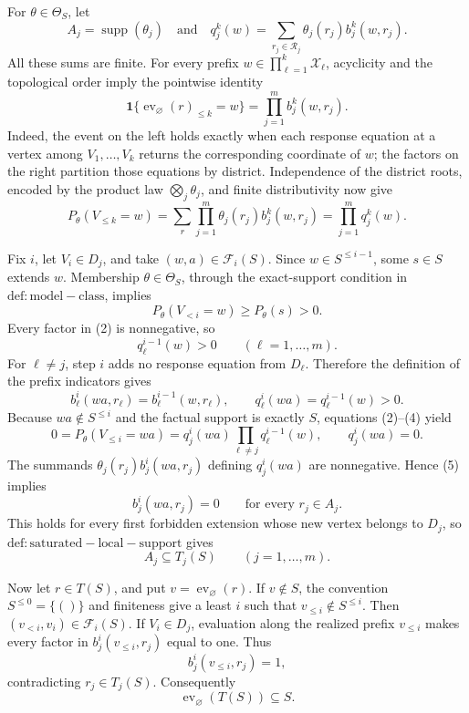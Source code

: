 For \(\theta\in\Theta_S\), let
\[
A_j=\operatorname{supp}(\theta_j)
\quad\text{and}\quad
q_j^k(w)=\sum_{r_j\in\mathcal R_j}\theta_j(r_j)b_j^k(w,r_j).
\]
All these sums are finite.  For every prefix \(w\in\prod_{\ell=1}^k\mathcal X_\ell\), acyclicity and the topological order imply the pointwise identity
\[
\mathbf 1\{\operatorname{ev}_{\varnothing}(r)_{\le k}=w\}
=\prod_{j=1}^m b_j^k(w,r_j).                                  \tag{1}
\]
Indeed, the event on the left holds exactly when each response equation at a vertex among \(V_1,\ldots,V_k\) returns the corresponding coordinate of \(w\); the factors on the right partition those equations by district.  Independence of the district roots, encoded by the product law \(\bigotimes_j\theta_j\), and finite distributivity now give
\[
P_\theta(V_{\le k}=w)
=\sum_r\prod_{j=1}^m\theta_j(r_j)b_j^k(w,r_j)
=\prod_{j=1}^m q_j^k(w).                                      \tag{2}
\]

Fix \(i\), let \(V_i\in D_j\), and take \((w,a)\in\mathcal F_i(S)\).  Since \(w\in S^{\le i-1}\), some \(s\in S\) extends \(w\).  Membership \(\theta\in\Theta_S\), through the exact-support condition in \(\mathrm{def:model-class}\), implies
\[
P_\theta(V_{<i}=w)\ge P_\theta(s)>0.
\]
Every factor in (2) is nonnegative, so
\[
q_\ell^{i-1}(w)>0\qquad(\ell=1,\ldots,m).                    \tag{3}
\]
For \(\ell\ne j\), step \(i\) adds no response equation from \(D_\ell\).  Therefore the definition of the prefix indicators gives
\[
b_\ell^i(wa,r_\ell)=b_\ell^{i-1}(w,r_\ell),
\qquad
q_\ell^i(wa)=q_\ell^{i-1}(w)>0.                              \tag{4}
\]
Because \(wa\notin S^{\le i}\) and the factual support is exactly \(S\), equations (2)--(4) yield
\[
0=P_\theta(V_{\le i}=wa)
=q_j^i(wa)\prod_{\ell\ne j}q_\ell^{i-1}(w),
\qquad q_j^i(wa)=0.                                           \tag{5}
\]
The summands \(\theta_j(r_j)b_j^i(wa,r_j)\) defining \(q_j^i(wa)\) are nonnegative.  Hence (5) implies
\[
b_j^i(wa,r_j)=0\qquad\text{for every }r_j\in A_j.
\]
This holds for every first forbidden extension whose new vertex belongs to \(D_j\), so \(\mathrm{def:saturated-local-support}\) gives
\[
A_j\subseteq T_j(S)\qquad(j=1,\ldots,m).                     \tag{6}
\]

Now let \(r\in T(S)\), and put \(v=\operatorname{ev}_{\varnothing}(r)\).  If \(v\notin S\), the convention \(S^{\le0}=\{()\}\) and finiteness give a least \(i\) such that \(v_{\le i}\notin S^{\le i}\).  Then \((v_{<i},v_i)\in\mathcal F_i(S)\).  If \(V_i\in D_j\), evaluation along the realized prefix \(v_{\le i}\) makes every factor in \(b_j^i(v_{\le i},r_j)\) equal to one.  Thus
\[
b_j^i(v_{\le i},r_j)=1,
\]
contradicting \(r_j\in T_j(S)\).  Consequently
\[
\operatorname{ev}_{\varnothing}(T(S))\subseteq S.            \tag{7}
\]

